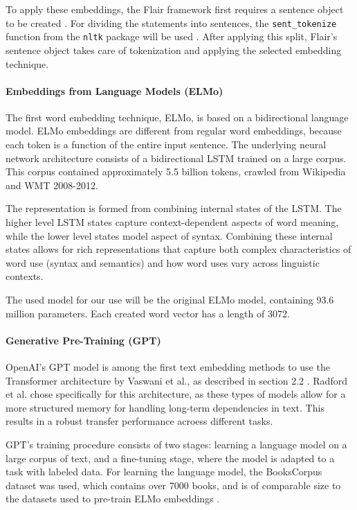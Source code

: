 To apply these embeddings, the Flair framework first requires a sentence object to be created \cite{flairsentence}.
For dividing the statements into sentences, the \texttt{sent\_tokenize} function from the \texttt{nltk} package will be used \cite{nltktokenize}. 
After applying this split, Flair's sentence object takes care of tokenization and applying the selected embedding technique.

\paragraph{Embeddings from Language Models (ELMo)}
The first word embedding technique, ELMo, is based on a bidirectional language model. 
ELMo embeddings are different from regular word embeddings, because each token is a function of the entire input sentence.
The underlying neural network architecture consists of a bidirectional LSTM trained on a large corpus.
This corpus contained approximately 5.5 billion tokens, crawled from Wikipedia and WMT 2008-2012.

The representation is formed from combining internal states of the LSTM. 
The higher level LSTM states capture context-dependent aspects of word meaning, while the lower level states model aspect of syntax.
Combining these internal states allows for rich representations that capture both complex characteristics of word use (syntax and semantics) and how word uses vary across linguistic contexts\cite{peters2018}.

The used model for our use will be the original ELMo model, containing 93.6 million parameters.
Each created word vector has a length of 3072. 

\paragraph{Generative Pre-Training (GPT)}
OpenAI's GPT model is among the first text embedding methods to use the Transformer architecture by Vaswani et al., as described in section 2.2 \cite{vaswani2017}.
Radford et al. chose specifically for this architecture, as these types of models allow for a more structured memory for handling long-term dependencies in text.
This results in a robust transfer performance acroess different tasks. 

GPT's training procedure consists of two stages: learning a language model on a large corpus of text, and a fine-tuning stage, where the model is adapted to a task with labeled data.
For learning the language model, the BooksCorpus dataset was used, which contains over 7000 books, and is of comparable size to the datasets used to pre-train ELMo embeddings \cite{radford2018}.

